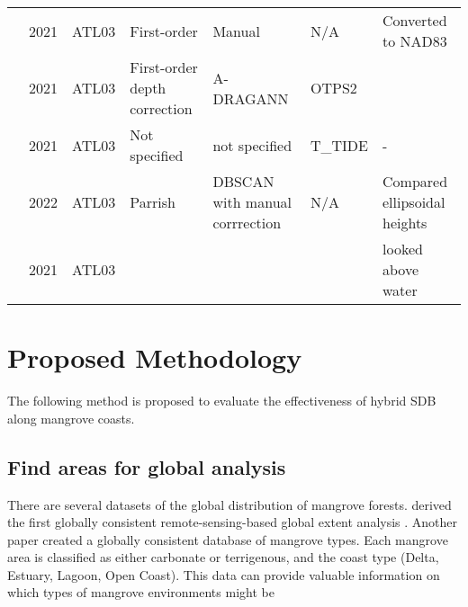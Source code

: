 \begin{landscape}
\begin{table}
\begin{tabular}{lllp{3cm}p{3cm}ll}
                  \citeauthor{Albright2021}             & 2021 & ATL03   & First-order                   & Manual                         & N/A             & Converted to NAD83           \\
                  \citeauthor{Cao2021}                            & 2021 & ATL03   & First-order depth correction  & A-DRAGANN                      & OTPS2           &                              \\
                  \citeauthor{Lee2021}                           & 2021 & ATL03   & Not specified                 & not specified                  & T\_TIDE         & -                            \\
                  \citeauthor{LeQuilleuc2022b}            & 2022 & ATL03   & Parrish                       & DBSCAN with manual corrrection & N/A             & Compared ellipsoidal heights \\
                  \citeauthor{Xu2022a}                            & 2021 & ATL03   &                               &                                &                 & looked above water           \\
                  \bottomrule
            \end{tabular}
      \end{table}
\end{landscape}

\chapter{Proposed Methodology}
The following method is proposed to evaluate the effectiveness of hybrid SDB along mangrove coasts.

\section{Find areas for global analysis}
There are several datasets of the global distribution of mangrove forests. \citeauthor{Giri2011b} derived the first globally consistent remote-sensing-based global extent analysis \parencite{Worthington2020}. Another paper \parencite{Worthington2020a} created a globally consistent database of mangrove types. Each mangrove area is classified as either carbonate or terrigenous, and the coast type (Delta, Estuary, Lagoon, Open Coast). This data can provide valuable information on which types of mangrove environments might be 

